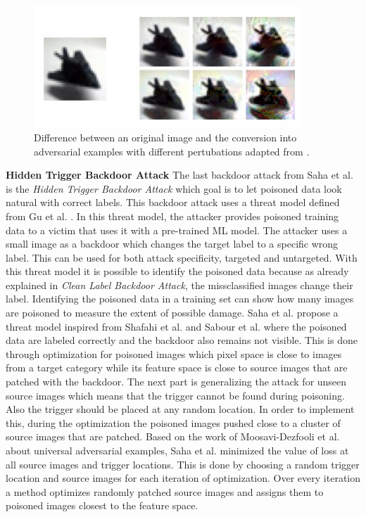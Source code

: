\begin{figure}[ht!]
  \centering
  \includegraphics[width=10cm]{pictures/poisoned_clean_label.jpg}
  \caption{Difference between an original image and the conversion into adversarial examples with different pertubations adapted from \cite{turner2018clean}.}
  \label{fig:poisoned_clean_label}
\end{figure}

\textbf{Hidden Trigger Backdoor Attack} The last backdoor attack from Saha et al. \cite{DBLP:journals/corr/abs-1910-00033} is the \textit{Hidden Trigger Backdoor Attack} which goal is to let poisoned data look natural with correct labels. This backdoor attack uses a threat model defined from Gu et al. \cite{DBLP:journals/corr/abs-1708-06733}. In this threat model, the attacker provides poisoned training data to a victim that uses it with a pre-trained ML model. The attacker uses a small image as a backdoor which changes the target label to a specific wrong label. This can be used for both attack specificity, targeted and untargeted. With this threat model it is possible to identify the poisoned data because as already explained in \textit{Clean Label Backdoor Attack}, the missclassified images change their label. Identifying the poisoned data in a training set can show how many images are poisoned to measure the extent of possible damage. Saha et al. propose a threat model inspired
from Shafahi et al. \cite{DBLP:journals/corr/abs-1804-00792} and Sabour et al. \cite{DBLP:journals/corr/SabourCFF15} where the poisoned data are labeled correctly and the backdoor also remains not visible. This is done through optimization for poisoned images which pixel space is close to images from a target category while its feature space is close to source images that are patched with the backdoor. The next part is generalizing the attack for unseen source images which means that the trigger cannot be found during poisoning. Also the trigger should be placed at any random location. In order to implement this, during the optimization the poisoned images pushed close to a cluster of source images that are patched. Based on the work of Moosavi-Dezfooli et al. \cite{DBLP:conf/cvpr/
Moosavi-Dezfooli17} about universal adversarial examples, Saha et al. minimized the value of loss at all source images and trigger locations. This is done by choosing a random trigger location and source images for each iteration of optimization. Over every iteration a method optimizes randomly patched source images and assigns them to poisoned images closest to the feature space.

